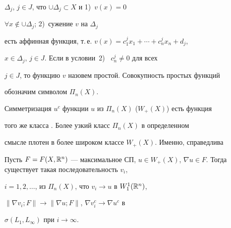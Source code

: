 $\Delta_j$, $j\in J$, что $\cup\Delta_j\subset X$ и 1)~$v(x)=0$ 


$\forall x\notin \cup\Delta_j$; 2)~сужение $v$ на $\Delta_j$ 


есть аффинная функция, т.\,е. $v(x)=c^j_1x_1+\dotsb+c^j_n x_n+d_j$, 


$x\in\Delta_j$, $j\in J$. Если в условии~2) \ $c^j_n\ne0$ для всех 


$j\in J$, то функцию $v$ назовем простой. Совокупность простых функций 


обозначим символом $\Pi_n(X)$. 


 


Симметризация $u^c$ функции $u$ из $\Pi_n(X)$ ($W_+(X)$) есть функция 


того же класса \cite{8}. Более узкий класс $\Pi_n(X)$ в определенном 


смысле плотен в более широком классе $W_+(X)$. Именно, справедлива 


 


\begin{lem} 


Пусть $F=F(X,\Bbb R^n)$ --- максимальное СП, $u\in W_+(X)$, $\nabla 


u\in F$. Тогда существует такая последовательность $v_i$, 


$i=1,2,\dotsc$, из $\Pi_n(X)$, что $v_i\to u$ в $W^1_1(\Bbb R^n)$, 


$\|\nabla v_i;F\|\to\|\nabla u;F\|$, $\nabla v^c_i\to\nabla u^c$ в 


$\sigma(L_1,L_\infty)$ при $i\to\infty$. 


\end{lem} 


 


